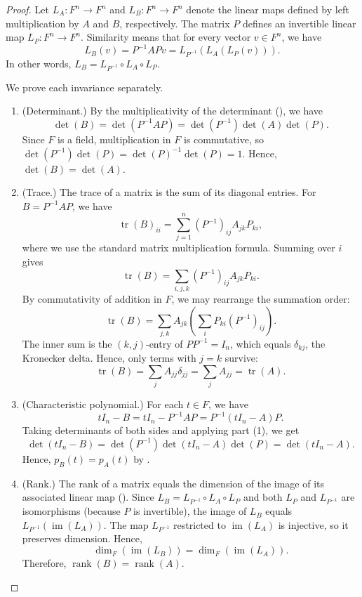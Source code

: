 \begin{proof}
    Let $L_A : F^n \to F^n$ and $L_B : F^n \to F^n$ denote the linear maps defined by left multiplication by $A$ and $B$, respectively. The matrix $P$ defines an invertible linear map $L_P : F^n \to F^n$. Similarity means that for every vector $v \in F^n$, we have
    $$L_B(v) = P^{-1}APv = L_{P^{-1}}(L_A(L_P(v))).$$
    In other words, $L_B = L_{P^{-1}} \circ L_A \circ L_P$.

    We prove each invariance separately.

    \begin{enumerate}
        \item (Determinant.) By the multiplicativity of the determinant (), we have
        $$\det(B) = \det(P^{-1}AP) = \det(P^{-1})\det(A)\det(P).$$
        Since $F$ is a field, multiplication in $F$ is commutative, so $\det(P^{-1})\det(P) = \det(P)^{-1}\det(P) = 1$. Hence, $\det(B) = \det(A)$.

        \item (Trace.) The trace of a matrix is the sum of its diagonal entries. For $B = P^{-1}AP$, we have
        $$\operatorname{tr}(B)_{ii} = \sum_{j=1}^n (P^{-1})_{ij}A_{jk}P_{ki},$$
        where we use the standard matrix multiplication formula. Summing over $i$ gives
        $$\operatorname{tr}(B) = \sum_{i,j,k} (P^{-1})_{ij}A_{jk}P_{ki}.$$
        By commutativity of addition in $F$, we may rearrange the summation order:
        $$\operatorname{tr}(B) = \sum_{j,k} A_{jk} \left(\sum_i P_{ki}(P^{-1})_{ij}\right).$$
        The inner sum is the $(k,j)$-entry of $PP^{-1} = I_n$, which equals $\delta_{kj}$, the Kronecker delta. Hence, only terms with $j = k$ survive:
        $$\operatorname{tr}(B) = \sum_j A_{jj}\delta_{jj} = \sum_j A_{jj} = \operatorname{tr}(A).$$

        \item (Characteristic polynomial.) For each $t \in F$, we have
        $$tI_n - B = tI_n - P^{-1}AP = P^{-1}(tI_n - A)P.$$
        Taking determinants of both sides and applying part (1), we get
        $$\det(tI_n - B) = \det(P^{-1})\det(tI_n - A)\det(P) = \det(tI_n - A).$$
        Hence, $p_B(t) = p_A(t)$ by .

        \item (Rank.) The rank of a matrix equals the dimension of the image of its associated linear map (). Since $L_B = L_{P^{-1}} \circ L_A \circ L_P$ and both $L_P$ and $L_{P^{-1}}$ are isomorphisms (because $P$ is invertible), the image of $L_B$ equals $L_{P^{-1}}(\operatorname{im}(L_A))$. The map $L_{P^{-1}}$ restricted to $\operatorname{im}(L_A)$ is injective, so it preserves dimension. Hence,
        $$\dim_F(\operatorname{im}(L_B)) = \dim_F(\operatorname{im}(L_A)).$$
        Therefore, $\operatorname{rank}(B) = \operatorname{rank}(A)$.
    \end{enumerate}
\end{proof}
